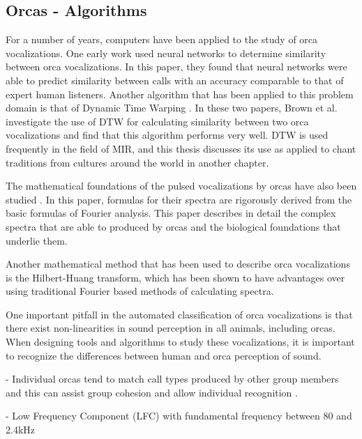 
\subsection{Orcas - Algorithms}

For a number of years, computers have been applied to the study of
orca vocalizations.  One early work \cite{deecke99} used neural
networks to determine similarity between orca vocalizations.  In this
paper, they found that neural networks were able to predict similarity
between calls with an accuracy comparable to that of expert human
listeners.  Another algorithm that has been applied to this problem
domain is that of Dynamic Time Warping
\cite{brown06_orca_dtw}\cite{brown07_orca_dtw}.  In these two papers,
Brown et al. investigate the use of DTW for calculating similarity
between two orca vocalizations and find that this algorithm performs
very well.  DTW is used frequently in the field of MIR, and this
thesis discusses its use as applied to chant traditions from cultures
around the world in another chapter.

The mathematical foundations of the pulsed vocalizations by orcas have
also been studied \cite{brown08_orca_pulsed_math}.  In this paper,
formulas for their spectra are rigorously derived from the basic
formulas of Fourier analysis.  This paper describes in detail the
complex spectra that are able to produced by orcas and the biological
foundations that underlie them.


  Another mathematical method that has
been used to describe orca vocalizations is the Hilbert-Huang
transform, which has been shown \cite{adam06_orca_hilber_huang} to
have advantages over using traditional Fourier based methods of
calculating spectra.

One important pitfall in the automated classification of orca
vocalizations \cite{deecke06} is that there exist non-linearities in
sound perception in all animals, including orcas\cite{nummela99}.
When designing tools and algorithms to study these vocalizations, it
is important to recognize the differences between human and orca
perception of sound.


- Individual orcas tend to match call types produced by other group
members \cite{miller04} and this can assist group cohesion
\cite{miller02} and allow individual recognition \cite{miller07}.

- Low Frequency Component (LFC) with fundamental frequency between 80 and
2.4kHz

